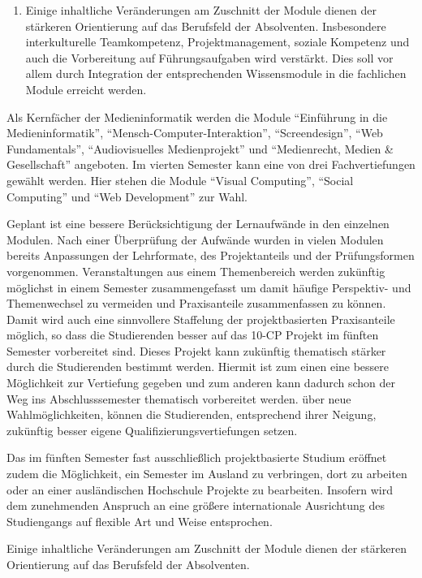 \begin{enumerate}
\def\labelenumi{\arabic{enumi}.}
\setcounter{enumi}{3}
\tightlist
\item
  Einige inhaltliche Veränderungen am Zuschnitt der Module dienen der
  stärkeren Orientierung auf das Berufsfeld der Absolventen.
  Insbesondere interkulturelle Teamkompetenz, Projektmanagement, soziale
  Kompetenz und auch die Vorbereitung auf Führungsaufgaben wird
  verstärkt. Dies soll vor allem durch Integration der entsprechenden
  Wissensmodule in die fachlichen Module erreicht werden.
\end{enumerate}

Als Kernfächer der Medieninformatik werden die Module ``Einführung in
die Medieninformatik'', ``Mensch-Computer-Interaktion'',
``Screendesign'', ``Web Fundamentals'', ``Audiovisuelles Medienprojekt''
und ``Medienrecht, Medien \& Gesellschaft'' angeboten. Im vierten
Semester kann eine von drei Fachvertiefungen gewählt werden. Hier stehen
die Module ``Visual Computing'', ``Social Computing'' und ``Web
Development'' zur Wahl.

Geplant ist eine bessere Berücksichtigung der Lernaufwände in den
einzelnen Modulen. Nach einer Überprüfung der Aufwände wurden in vielen
Modulen bereits Anpassungen der Lehrformate, des Projektanteils und der
Prüfungsformen vorgenommen. Veranstaltungen aus einem Themenbereich
werden zukünftig möglichst in einem Semester zusammengefasst um damit
häufige Perspektiv- und Themenwechsel zu vermeiden und Praxisanteile
zusammenfassen zu können. Damit wird auch eine sinnvollere Staffelung
der projektbasierten Praxisanteile möglich, so dass die Studierenden
besser auf das 10-CP Projekt im fünften Semester vorbereitet sind.
Dieses Projekt kann zukünftig thematisch stärker durch die Studierenden
bestimmt werden. Hiermit ist zum einen eine bessere Möglichkeit zur
Vertiefung gegeben und zum anderen kann dadurch schon der Weg ins
Abschlusssemester thematisch vorbereitet werden. über neue
Wahlmöglichkeiten, können die Studierenden, entsprechend ihrer Neigung,
zukünftig besser eigene Qualifizierungsvertiefungen setzen.

Das im fünften Semester fast ausschließlich projektbasierte Studium
eröffnet zudem die Möglichkeit, ein Semester im Ausland zu verbringen,
dort zu arbeiten oder an einer ausländischen Hochschule Projekte zu
bearbeiten. Insofern wird dem zunehmenden Anspruch an eine größere
internationale Ausrichtung des Studiengangs auf flexible Art und Weise
entsprochen.

Einige inhaltliche Veränderungen am Zuschnitt der Module dienen der
stärkeren Orientierung auf das Berufsfeld der Absolventen.

